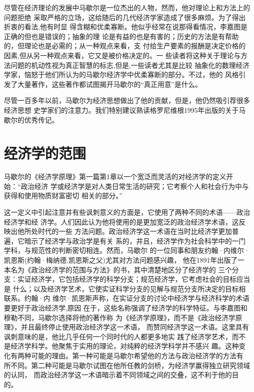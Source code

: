 尽管在经济理论的发展中马歇尔是一位杰出的人物，然而，他对理论上和方法上的问题拒绝
采取严格的立场，这给随后的几代经济学家造成了很多麻烦。为了得出折衷的看法,他有时显
得含糊和优柔寡断。他似乎经常在说那得看情况，李嘉图是正确的但也是错误的；抽象的理
论是有益的也是有害的；历史的方法是有帮助的，但理论也是必需的；从一种观点来看，支
付给生产要素的报酬是决定价格的因素,但从另一种观点来看，它又是被价格决定的。一
些读者将这种关于理论与方法问题的机动性视为真正智慧的标志,但是,一些读者尤其是比较
抽象化的数理经济学家，恼怒于他们所认为的马歇尔经济学中优柔寡断的部分。不过，他的
风格引发了大量著作，这些著作都试图揭开马歇尔的“真正用意”是什么。

尽管一百多年以前，马歇尔为经济思想做出了他的贡献，但是，他仍然吸引荐很多经济思想
史学家们的注意力。我们特别建议熟读格罗尼维根1995年出版的关于马歇尔的优秀传记。

\section{经济学的范围}

马歇尔的《经济学原理》第一篇第1章以一个宽泛而灵活的对经济学的定义开始：“政治经济
学或经济学是对人类日常生活的研究；它考察个人和社会行为中与获得和使用物质财富密切
相关的部分。”

这一定义中引起注意并有些讽刺意义的方面是，它使用了两种不同的术语——政治经济学和经
济学。人们因此认为他将使用的是更加宽泛的政治经济学术语，这反映出他所处时代的一些
方法问题。政治经济学这一术语在当时比经济学更加普遍，它暗示了经济学与政治学是有关
系的，并且，经济学作为社会科学中的一门学科，与规范性的判断密切相连。然而，马歇尔
的一位同事和朋友约翰·内维尔·凯恩斯(约翰·梅纳德.凯恩斯之父)尤其对方法问题感兴趣，
他在1891年出版了一本名为《政治经济学的范围与方法》的书，其中清楚地区分了经济学的
三个分支：实证经济学，它包括经济学的科学分支；规范经济学，它考虑社会的目标应当是
什么；以及经济学艺术，它使实证科学分支的见解与规范分支所决定的目标相联系。约翰·内
维尔·凯恩斯声称，在实证分支的讨论中经济学与经济科学的术语要更好于政治经济学,原因
在于，这些名称强调了经济学的科学特征。与李嘉图和穆勒不同，马歇尔选择将他的著作称
为《经济学原理》，而不是《政治经济学原理》，并且最终停止使用政治经济学这一术语，
而赞同经济学这一术语。这里具有讽刺意味的是，他比几乎任何一个同时代的人都更多地实
践了经济学艺术，而不是经济学科学。他聚焦于实用的理论，对纯粹的经济学科学并不感兴
趣。这种变化有两种可能的理由。第一种可能是马歇尔希望他的方法与政治经济学的方法有
所不同。第二种可能是马歇尔试图在他所任教的剑桥，为经济学赢得独立研究领域的认同，
而政治经济学这一术语暗示着不同领域之间的交叠，这不利于他的目的。

